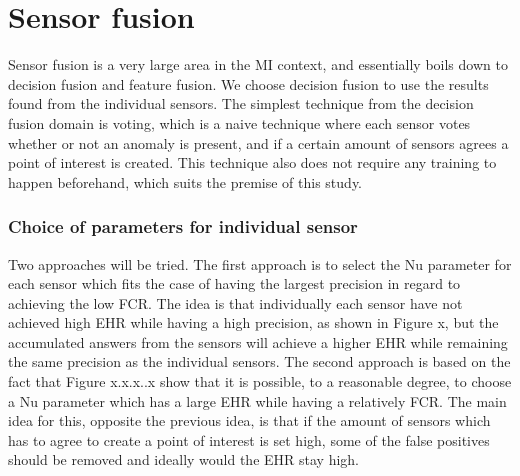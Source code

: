 \section{Sensor fusion}
Sensor fusion is a very large area in the MI context, and essentially boils down to decision fusion and feature fusion. 
We choose decision fusion to use the results found from the individual sensors.
The simplest technique from the decision fusion domain is voting, which is a naive technique where each sensor votes whether or not an anomaly is present, and if a certain amount of sensors agrees a point of interest is created. This technique also does not require any training to happen beforehand, which suits the premise of this study.

\subsubsection{Choice of parameters for individual sensor}
Two approaches will be tried. The first approach is to select the Nu parameter for each sensor which fits the case of having the largest precision in regard to achieving the low FCR. The idea is that individually each sensor have not achieved high EHR while having a high precision, as shown in Figure x, but the accumulated answers from the sensors will achieve a higher EHR while remaining the same precision as the individual sensors.
The second approach is based on the fact that Figure x.x.x..x show that it is possible, to a reasonable degree, to choose a Nu parameter which has a large EHR while having a relatively FCR. The main idea for this, opposite the previous idea, is that if the amount of sensors which has to agree to create a point of interest is set high, some of the false positives should be removed and ideally would the EHR stay high.



